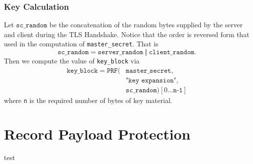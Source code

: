 \documentclass[aspectratio=169]{beamer}
\begin{document}
\begin{frame}
	\frametitle{Key Calculation}
	Let $\texttt{sc\_random}$ be the concatenation of the random bytes supplied by the server and client during the TLS Handshake. Notice that the order is reversed form that used in the computation of \texttt{master\_secret}. That is
	\begin{equation} \nonumber
	\texttt{sc\_random} = \texttt{server\_random} \ \Vert \ \texttt{client\_random}.
	\end{equation}
	Then we compute the value of \texttt{key\_block} via
	\begin{equation} \nonumber
	\begin{split}
		\texttt{key\_block} = \texttt{PRF}(&\texttt{master\_secret}, \\
		&\texttt{"key expansion"},\\
		&\texttt{sc\_random})[0\ldots \texttt{n-1}]
	\end{split}
	\end{equation}
	where \texttt{n} is the required number of bytes of key material.
\end{frame}

\section{Record Payload Protection}
\begin{frame}[Roundel=siiorange]
	\tocpage
\end{frame}

\begin{frame}
	test
\end{frame}
\end{document}
